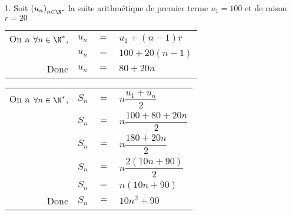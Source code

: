 \vspace*{.3cm}

\begin{itemize}
\item[1.] Soit $\left(u_n\right)_{n\in \N^*}$ la suite arithmétique de premier terme $u_1 = 100$ et de raison $r = 20$ \\

\begin{tabular}{rrll}
On a $\forall n \in \N^*$, & $u_n$ & $ =$ & $ u_1 + \left(n-1\right)r$ \\
& $u_n$ & $=$ & $100 + 20\left(n-1\right)$ \\
Donc & $u_n$ & $=$ & $80 + 20n$ \\
\end{tabular}

\vspace*{.3cm} 

\begin{tabular}{rrll}
On a $\forall n \in \N^*$, & $S_n$ & $ = $ & $ n \dfrac{u_1 + u_n}{2}$ \vspace*{.3cm} \\
& $S_n$ & $=$ & $n \dfrac{100 + 80 + 20n}{2}$ \vspace*{.3cm} \\
& $S_n$ & $=$ & $n \dfrac{180 + 20n}{2}$ \vspace*{.3cm} \\
& $S_n$ & $=$ & $n \dfrac{2\left(10n + 90\right)}{2}$ \vspace*{.3cm} \\
& $S_n$ & $=$ & $n\left(10n + 90\right)$ \vspace*{.3cm} \\
Donc & $S_n$ & $=$ & $10n^2 + 90$
\end{tabular}

\vspace*{-5cm}

\end{itemize}

\newpage


